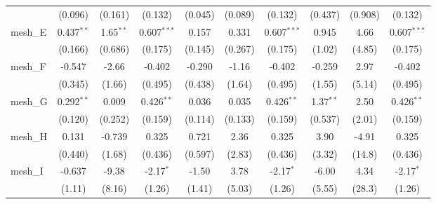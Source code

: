 \begin{tabular}{lccccccccc}
                                                               & (0.096)        & (0.161)        & (0.132)        & (0.045)       & (0.089)        & (0.132)        & (0.437)       & (0.908)      & (0.132)\\   
   mesh\_E                                                     & 0.437$^{**}$   & 1.65$^{**}$    & 0.607$^{***}$  & 0.157         & 0.331          & 0.607$^{***}$  & 0.945         & 4.66         & 0.607$^{***}$\\   
                                                               & (0.166)        & (0.686)        & (0.175)        & (0.145)       & (0.267)        & (0.175)        & (1.02)        & (4.85)       & (0.175)\\   
   mesh\_F                                                     & -0.547         & -2.66          & -0.402         & -0.290        & -1.16          & -0.402         & -0.259        & 2.97         & -0.402\\   
                                                               & (0.345)        & (1.66)         & (0.495)        & (0.438)       & (1.64)         & (0.495)        & (1.55)        & (5.14)       & (0.495)\\   
   mesh\_G                                                     & 0.292$^{**}$   & 0.009          & 0.426$^{**}$   & 0.036         & 0.035          & 0.426$^{**}$   & 1.37$^{**}$   & 2.50         & 0.426$^{**}$\\   
                                                               & (0.120)        & (0.252)        & (0.159)        & (0.114)       & (0.133)        & (0.159)        & (0.537)       & (2.01)       & (0.159)\\   
   mesh\_H                                                     & 0.131          & -0.739         & 0.325          & 0.721         & 2.36           & 0.325          & 3.90          & -4.91        & 0.325\\   
                                                               & (0.440)        & (1.68)         & (0.436)        & (0.597)       & (2.83)         & (0.436)        & (3.32)        & (14.8)       & (0.436)\\   
   mesh\_I                                                     & -0.637         & -9.38          & -2.17$^{*}$    & -1.50         & 3.78           & -2.17$^{*}$    & -6.00         & 4.34         & -2.17$^{*}$\\   
                                                               & (1.11)         & (8.16)         & (1.26)         & (1.41)        & (5.03)         & (1.26)         & (5.55)        & (28.3)       & (1.26)\\   

\end{tabular}
